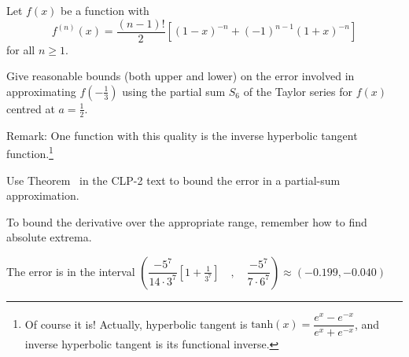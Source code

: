 \begin{question}
	Let $f(x)$ be a function with
	\[f^{(n)}(x)=\frac{(n-1)!}{2}\left[(1-x)^{-n}+(-1)^{n-1}(1+x)^{-n} \right]\]
	for all $n \ge 1$.

	Give reasonable bounds (both upper and lower) on the error involved in approximating $f\left(-\frac13 \right)$ using the partial sum $S_6$ of the Taylor series for $f(x)$ centred at $a=\frac12$.

Remark: One function with this quality is the inverse hyperbolic tangent function.\footnote{Of course it is! Actually,
hyperbolic tangent is $\mathrm{tanh}(x) = \dfrac{e^x-e^{-x}}{e^x+e^{-x}}$, and inverse hyperbolic tangent is its
functional inverse.}
\end{question}
\begin{hint}
Use Theorem~ in the CLP-2 text to bound the error in a partial-sum approximation.

To bound the derivative over the appropriate range, remember how to find absolute extrema.
\end{hint}
\begin{answer}
The error is in the interval $\displaystyle\left(\dfrac{-5^7}{14\cdot 3^7}\left[1+\frac{1}{3^7} \right]\quad,\quad \dfrac{-5^7}{7\cdot 6^7} \right)\approx\left(-0.199, -0.040\right)$
\end{answer}
